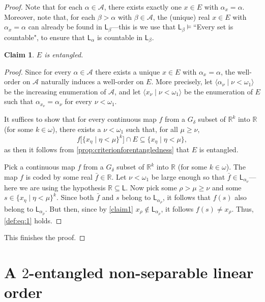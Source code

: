 \documentclass[12pt]{amsart}
\newtheorem{claim}{Claim}[theorem]
\theoremstyle{definition}
\theoremstyle{remark}
\begin{document}
\begin{proof}
Note that for each $\alpha \in \mathcal{A}$, there exists exactly one $x \in E$ with $\alpha_x = \alpha$. Moreover, note that, for each $\beta > \alpha$ with $\beta \in \mathcal{A}$, the (unique) real $x \in E$ with $\alpha_x = \alpha$ can already be found in $\mathsf{L}_\beta$---this is  we use that $\mathsf{L}_\beta \vDash $``Every set is countable", to ensure that $\mathsf{L}_\alpha$ is countable in $\mathsf{L}_\beta$.

\begin{claim}
$E$ is entangled.
\end{claim}
\begin{proof}
Since for every $\alpha \in \mathcal{A}$ there exists a unique $x \in E$ with $\alpha_x = \alpha$, the well-order on $\mathcal{A}$ naturally induces a well-order on $E$. More precisely, let $\langle \alpha_\nu \mid \nu < \omega_1 \rangle$ be the increasing enumeration of $\mathcal{A}$, and let $\langle x_\nu \mid \nu < \omega_1\rangle$ be the enumeration of $E$ such that $\alpha_{x_\nu} = \alpha_\nu$ for every $\nu < \omega_1$.

It suffices to show that for every continuous map $f$ from a $G_\delta$ subset of $\mathbb{R}^k$ into $\mathbb{R}$ (for some $k \in\omega$), there exists a $\nu < \omega_1$ such that, for all $\mu \ge \nu$,
\begin{equation}\label{def:eq:1}
f\big[\{x_\eta \mid \eta < \mu\}^k\big] \cap E \subseteq \{x_\eta \mid \eta < \mu\},
\end{equation}
as then it follows from \cref{prop:criterionforentangledness} that $E$ is entangled.

Pick a continuous map $f$ from a $G_\delta$ subset of $\mathbb{R}^k$ into $\mathbb{R}$ (for some $k \in\omega$). The map $f$ is coded by some real $\bar{f} \in \mathbb{R}$. Let $\nu < \omega_1$ be large enough so that $\bar{f} \in \mathsf{L}_{\alpha_\nu}$---here we are using the hypothesis $\mathbb{R} \subseteq \mathsf{\mathsf{L}}$. Now pick some $\rho > \mu \ge \nu$ and some $s \in \{x_\eta \mid \eta < \mu\}^k$. Since both $\bar{f}$ and $s$ belong to $\mathsf{L}_{\alpha_\rho}$, it follows that $f(s)$ also belong to $\mathsf{L}_{\alpha_\rho}$. But then, since by \cref{claim1} $x_\rho \not\in \mathsf{L}_{\alpha_\rho}$, it follows $f(s) \neq x_\rho$.  Thus, \eqref{def:eq:1} holds.
\end{proof}
This finishes the proof.
\end{proof}

\section{A $2$-entangled non-separable linear order}\label{sec:thm4}
\end{document}

